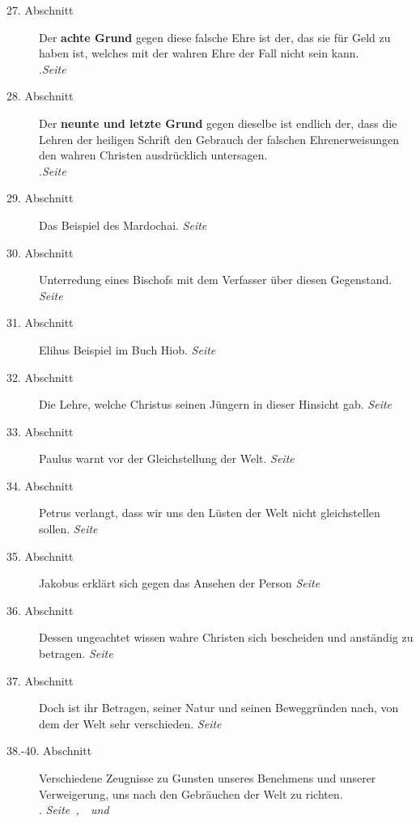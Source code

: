 \begin{description}
\item[27. Abschnitt] Der \textbf{achte Grund} gegen diese falsche Ehre ist der,
das sie
für Geld zu haben ist, welches mit der wahren Ehre der Fall nicht sein kann.\\
.\dotfill \textit{Seite~\pageref{kap9_ab27}}\\
\item[28. Abschnitt] Der \textbf{neunte und letzte Grund} gegen dieselbe ist
endlich der,
dass die Lehren der heiligen Schrift den Gebrauch der falschen Ehrenerweisungen
den wahren Christen ausdrücklich untersagen.
\\.\dotfill \textit{Seite~\pageref{kap9_ab28}}\\
\item[29. Abschnitt] Das Beispiel des Mardochai.
\dotfill \textit{Seite~\pageref{kap9_ab29}}\\
\item[30. Abschnitt] Unterredung eines Bischofs mit dem Verfasser über diesen
Gegenstand.
\dotfill \textit{Seite~\pageref{kap9_ab30}}\\
\item[31. Abschnitt] Elihus Beispiel im Buch Hiob.
\dotfill \textit{Seite~\pageref{kap9_ab31}}\\
\item[32. Abschnitt] Die Lehre, welche Christus seinen Jüngern in dieser
Hinsicht gab.
\dotfill \textit{Seite~\pageref{kap9_ab32}}\\
\item[33. Abschnitt] Paulus warnt vor der Gleichstellung der Welt.
\dotfill \textit{Seite~\pageref{kap9_ab33}}\\
\item[34. Abschnitt] Petrus verlangt, dass wir uns den Lüsten der Welt nicht
gleichstellen sollen.
\dotfill \textit{Seite~\pageref{kap9_ab34}}\\
\item[35. Abschnitt] Jakobus erklärt sich gegen das Ansehen der Person
\dotfill \textit{Seite~\pageref{kap9_ab35}}\\
\item[36. Abschnitt] Dessen ungeachtet wissen wahre Christen sich bescheiden und
anständig zu betragen.
\dotfill \textit{Seite~\pageref{kap9_ab36}}\\
\item[37. Abschnitt] Doch ist ihr Betragen, seiner Natur und seinen Beweggründen
nach, von dem der Welt sehr verschieden.
\dotfill \textit{Seite~\pageref{kap9_ab37}}\\
\item[38.-40. Abschnitt] Verschiedene Zeugnisse zu Gunsten unseres Benehmens und
unserer Verweigerung, uns nach den Gebräuchen der Welt zu richten.\\
.\dotfill
\textit{Seite~\pageref{kap9_ab38},~\pageref{kap9_ab39}~und~\pageref{kap9_ab40}}
\\

\end{description}

